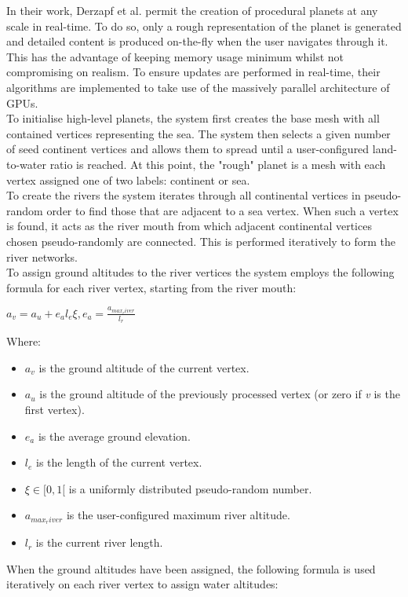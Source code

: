 In their work, Derzapf et al. permit the creation of procedural planets at any scale in real-time. To do so, only a rough representation of the planet is generated and detailed content is produced on-the-fly when the user navigates through it. This has the advantage of keeping memory usage minimum whilst not compromising on realism. To ensure updates are performed in real-time, their algorithms are implemented to take use of the massively parallel architecture of GPUs. \\
To initialise high-level planets, the system first creates the base mesh with all contained vertices representing the sea. The system then selects a given number of seed continent vertices and allows them to spread until a user-configured land-to-water ratio is reached. At this point, the "rough" planet is a mesh with each vertex assigned one of two labels: continent or sea.\\
To create the rivers the system iterates through all continental vertices in pseudo-random order to find those that are adjacent to a sea vertex. When such a vertex is found, it acts as the river mouth from which adjacent continental vertices chosen pseudo-randomly are connected. This is performed iteratively to form the river networks.\\
To assign ground altitudes to the river vertices the system employs the following formula for each river vertex, starting from the river mouth:

$a_{v} = a_{u} + e_{a}l_{e}\xi , e_{a} = \frac{a_{max_river}}{l_{r}} $

Where:
\begin{itemize}
\item $a_{v}$ is the ground altitude of the current vertex.
\item $a_{u}$ is the ground altitude of the previously processed vertex (or zero if \textit{v} is the first vertex).
\item $e_{a}$ is the average ground elevation.
\item $l_{e}$ is the length of the current vertex.
\item $\xi \in [0,1[$ is a uniformly distributed pseudo-random number.
\item $a_{max_river}$ is the user-configured maximum river altitude.
\item $l_{r}$ is the current river length.
\end{itemize}

When the ground altitudes have been assigned, the following formula is used iteratively on each river vertex to assign water altitudes:

